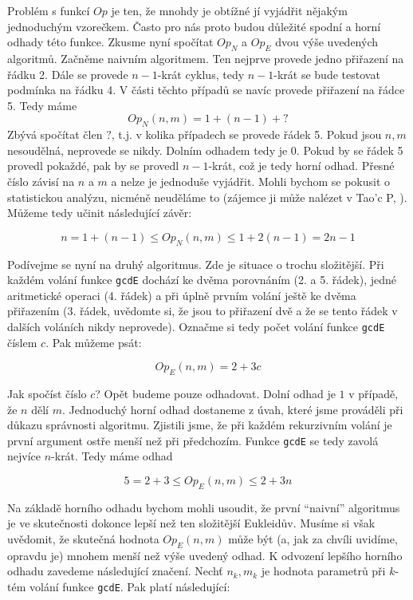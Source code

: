 Problém s funkcí $Op$ je ten, že mnohdy je obtížné jí vyjádřit nějakým jednoduchým vzorečkem. Často pro nás proto budou
důležité spodní a horní odhady této funkce. Zkusme nyní spočítat $Op_N$ a $Op_E$ dvou výše uvedených algoritmů. Začněme
naivním algoritmem. Ten nejprve provede jedno přiřazení na řádku 2. Dále se provede $n-1$-krát cyklus, tedy $n-1$-krát
se bude testovat podmínka na řádku 4. V části těchto případů se navíc provede přiřazení na řádce 5. Tedy máme
\begin{displaymath}
 Op_N(n,m) = 1 + (n-1) + ?
\end{displaymath}
Zbývá spočítat člen $?$, t.j. v kolika případech se provede řádek 5. Pokud jsou $n,m$ nesoudělná, neprovede se nikdy.
Dolním odhadem tedy je $0$. Pokud by se řádek 5 provedl pokaždé, pak by se provedl $n-1$-krát, což je tedy horní odhad.
Přesné číslo závisí na $n$ a $m$ a nelze je jednoduše vyjádřit. Mohli bychom se pokusit o statistickou analýzu, nicméně
neuděláme to (zájemce ji může nalézet v Tao'c P, \cite{TAOCP2}). Můžeme tedy učinit následující závěr:

\begin{displaymath}
 n = 1 + (n-1) \leq Op_N(n,m) \leq 1 + 2(n-1) = 2n - 1
\end{displaymath}


Podívejme se nyní na druhý algoritmus. Zde je situace o trochu složitější. Při každém volání funkce {\tt gcdE} dochází ke 
dvěma porovnáním (2. a 5. řádek), jedné aritmetické operaci (4. řádek) a při úplně prvním volání ještě ke dvěma přiřazením 
(3. řádek, uvědomte si, že jsou to přiřazení dvě a že se tento řádek v dalších
voláních nikdy neprovede). Označme si tedy počet volání funkce {\tt gcdE} číslem $c$. Pak můžeme psát:

\begin{displaymath}
Op_E(n,m) = 2 + 3c
\end{displaymath}

Jak spočíst číslo $c$? Opět budeme pouze odhadovat. Dolní odhad je $1$ v případě, že $n$ dělí $m$. Jednoduchý horní odhad dostaneme
z úvah, které jsme prováděli při důkazu správnosti algoritmu. Zjistili jsme, že při každém rekurzivním volání je první argument ostře 
menší než při předchozím. Funkce {\tt gcdE} se tedy zavolá nejvíce $n$-krát. Tedy máme odhad

\begin{displaymath}
 5 = 2+3\leq Op_E(n,m) \leq 2 + 3n
\end{displaymath}

Na základě horního odhadu bychom mohli usoudit, že první ``naivní'' algoritmus je ve skutečnosti dokonce lepší než ten složitější
Eukleidův. Musíme si však uvědomit, že skutečná hodnota $Op_E(n,m)$ může být (a, jak za chvíli
uvidíme, opravdu je) mnohem menší než výše uvedený odhad. K odvození lepšího horního odhadu zavedeme následující značení. Nechť
$n_k,m_k$ je hodnota parametrů při $k$-tém volání funkce {\tt gcdE}. Pak platí následující:

